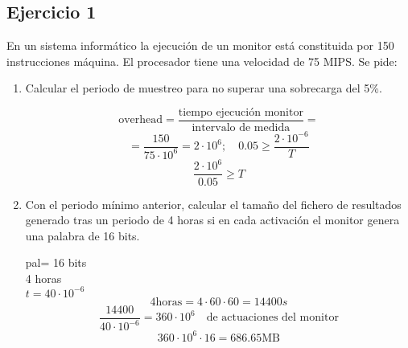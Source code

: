 \subsection{Ejercicio 1}
\noindent
En un sistema informático la ejecución de un monitor está constituida por 150 instrucciones máquina. El procesador tiene una velocidad de 75 MIPS. Se pide:
\begin{enumerate}
    \item Calcular el periodo de muestreo para no superar una sobrecarga del 5\%.
\begin{tcolorbox}[colback=white,colframe=cyan!50!black,fonttitle=\bfseries]
\[
\text{overhead}=\dfrac{\text{tiempo ejecución monitor}}{\text{intervalo de medida}}=
\]
\[
=\dfrac{150}{75\cdot 10^6}=2\cdot 10^6; \quad 0.05\geq \dfrac{2\cdot 10^{-6}}{T}
\]
\[
\dfrac{2\cdot 10^6}{0.05}\geq T
\]
\end{tcolorbox}    
    \item Con el periodo mínimo anterior, calcular el tamaño del fichero de resultados generado tras un periodo de 4 horas si en cada activación el monitor genera una palabra de 16 bits.
\begin{tcolorbox}[colback=white,colframe=cyan!50!black,fonttitle=\bfseries]
pal= 16 bits\\
4 horas\\
$t=40\cdot 10^{-6}$
\[
4\text{horas}=4\cdot 60\cdot 60=14400s
\]
\[
\dfrac{14400}{40\cdot 10^{-6}}=360\cdot 10^6 \quad\text{de actuaciones del monitor}
\]
\[
360\cdot 10^6\cdot 16=686.65\text{MB}
\]
\end{tcolorbox}    
\end{enumerate}
